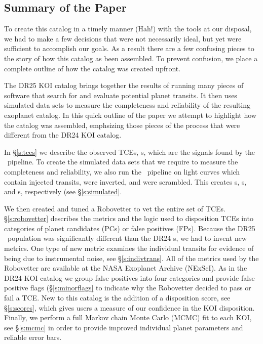 \subsection{Summary of the Paper}
To create this catalog in a timely manner (Hah!) with the tools at our disposal, we had to make a few decisions that were not necessarily ideal, but yet were sufficient to accomplish our goals.  As a result there are a few confusing pieces to the story of how this catalog as been assembled. To prevent confusion, we place a complete outline of how the catalog was created upfront.

The DR25 KOI catalog brings together the results of running many pieces of software that search for and evaluate potential planet transits. It then uses simulated data sets to measure the completeness and reliability of the resulting exoplanet catalog.  In this quick outline of the paper we attempt to highlight how the catalog was assembled, emphsizing those pieces of the process that were different from the DR24 KOI catalog.

In \S\ref{s:tces} we describe the observed TCEs, \opstce s, which are the signals found by the \Kepler\ pipeline. To create the simulated data sets that we require to measure the completeness and reliability, we also run the \Kepler\ pipeline on light curves which contain injected transits, were inverted, and were scrambled. This creates \injtce s, \invtce s, and \scrtce s, respectively (see \S\ref{s:simulated}.  

We then created and tuned a Robovetter to vet the entire set of TCEs. \S\ref{s:robovetter} describes the metrics and the logic used to disposition TCEs into categories of planet candidates (PCs) or false positives (FPs). Because the DR25 \opstce\ population was significantly different than the DR24 \opstce s, we had to invent new metrics. One type of new metric examines the individual transits for evidence of being due to instrumental noise, see \S\ref{s:indivtrans}.  All of the metrics used by the Robovetter are available at the NASA Exoplanet Archive (NExScI). As in the DR24 KOI catalog we group false positives into four categories and provide false positive flags (\S\ref{s:minorflags} to indicate why the Robovetter decided to pass or fail a TCE.  New to this catalog is the addition of a disposition score, see \S\ref{s:scores}, which gives users a measure of our confidence in the KOI disposition. Finally, we perform a full Markov chain Monte Carlo (MCMC) fit to each KOI, see \S\ref{s:mcmc} in order to provide improved individual planet parameters and reliable error bars.

